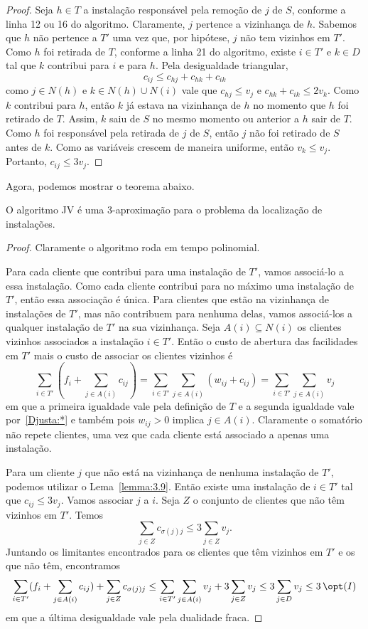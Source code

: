 \begin{proof}
    Seja $h \in T$ a instalação responsável pela remoção de $j$ de $S$, conforme a linha 12 ou 16 do algoritmo. Claramente, $j$ pertence a vizinhança de $h$. Sabemos que $h$ não pertence a $T'$ uma vez que, por hipótese, $j$ não tem vizinhos em $T'$. Como $h$ foi retirada de $T$, conforme a linha 21 do algoritmo, existe $i \in T'$ e $k \in D$ tal que $k$ contribui para $i$ e para $h$. Pela desigualdade triangular,
    \[c_{ij} \leq c_{hj} + c_{hk} + c_{ik}\]
    como $j \in N(h)$ e $k \in N(h) \cup N(i)$ vale que $c_{hj} \leq v_j$ e $c_{hk} + c_{ik} \leq 2v_k$. Como $k$ contribui para $h$, então $k$ já estava na vizinhança de $h$ no momento que $h$ foi retirado de $T$. Assim, $k$ saiu de $S$ no mesmo momento ou anterior a $h$ sair de $T$. Como $h$ foi responsável pela retirada de $j$ de $S$, então $j$ não foi retirado de $S$ antes de $k$. Como as variáveis crescem de maneira uniforme, então $v_k \leq v_j$. 
    Portanto, $c_{ij}\leq 3v_j$. 
\end{proof}

Agora, podemos mostrar o teorema abaixo.
\begin{theorem}
    O algoritmo {\sc JV} é uma $3$-aproximação para o problema da localização de instalações.
\end{theorem}
\begin{proof}
    Claramente o algoritmo roda em tempo polinomial. 

    Para cada cliente que contribui para uma instalação de $T'$, vamos associá-lo a essa instalação. Como cada cliente contribui para no máximo uma instalação de $T'$, então essa associação é única. Para clientes que estão na vizinhança de instalações de $T'$, mas não contribuem para nenhuma delas, vamos associá-los a qualquer instalação de $T'$ na sua vizinhança.
    Seja $A(i) \subseteq N(i)$ os clientes vizinhos associados a instalação $i \in T'$. Então o custo de abertura das facilidades em $T'$ mais o custo de associar os clientes vizinhos é
    \[\sum_{i \in T'} (f_i + \sum_{j \in A(i)} c_{ij}) = \sum_{i \in T'} \sum_{j \in A(i)} (w_{ij} + c_{ij}) = \sum_{i \in T'} \sum_{j \in A(i)} v_j\]
    em que a primeira igualdade vale pela definição de $T$ e a segunda igualdade vale por~\eqref{Djusta:*} e também pois $w_{ij} > 0$ implica $j \in A(i)$. Claramente o somatório não repete clientes, uma vez que cada cliente está associado a apenas uma instalação.

    Para um cliente $j$ que não está na vizinhança de nenhuma instalação de $T'$, podemos utilizar o Lema~\ref{lemma:3.9}. Então existe uma instalação de $i \in T'$ tal que $c_{ij} \leq 3v_j$. Vamos associar $j$ a $i$. Seja $Z$ o conjunto de clientes que não têm vizinhos em $T'$. Temos
    \[\sum_{j \in Z}c_{\sigma(j)j} \leq 3\sum_{j \in Z}v_j.\]
    Juntando os limitantes encontrados para os clientes que têm vizinhos em $T'$ e os que não têm, encontramos
    \[\sum_{i \in T'} (f_i + \sum_{j \in A(i)} c_{ij}) + \sum_{j \in Z} c_{\sigma(j)j}\leq \sum_{i \in T'} \sum_{j \in A(i)} v_j + 3 \sum_{j \in Z} v_j \leq 3 \sum_{j \in D} v_j\leq 3\,\opt(I)\]
    em que a última desigualdade vale pela dualidade fraca.
\end{proof}